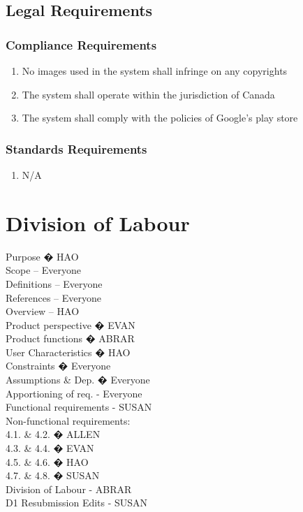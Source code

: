 \documentclass[]{article}
\begin{document}

\subsection{Legal Requirements}
\label{sub:legal_requirements}

\subsubsection{Compliance Requirements}
\label{ssub:compliance_requirements}
\begin{enumerate}[{LR}1.]
	\item No images used in the system shall infringe on any copyrights
	\item The system shall operate within the jurisdiction of Canada
	\item The system shall comply with the policies of Google's play store
\end{enumerate}

\subsubsection{Standards Requirements}
\label{ssub:standards_requirements}
\begin{enumerate}[{LR}4.]
	\item {\color{red}N/A}

\end{enumerate}



\newpage 

\appendix
\section{Division of Labour}
\label{sec:division_of_labour}

Purpose � HAO \\
Scope -- Everyone \\
Definitions -- Everyone \\
References -- Everyone \\
Overview -- HAO \\
Product perspective � EVAN \\
Product functions � ABRAR \\
User Characteristics � HAO \\
Constraints � Everyone \\
Assumptions \& Dep. � Everyone \\
Apportioning of req. - Everyone \\
Functional requirements - SUSAN \\
Non-functional requirements: \\
4.1. \& 4.2. � ALLEN \\
4.3. \& 4.4. � EVAN \\
4.5. \& 4.6. � HAO \\
4.7. \& 4.8. � SUSAN \\
Division of Labour - ABRAR\\
D1 Resubmission Edits - SUSAN

\end{document}
